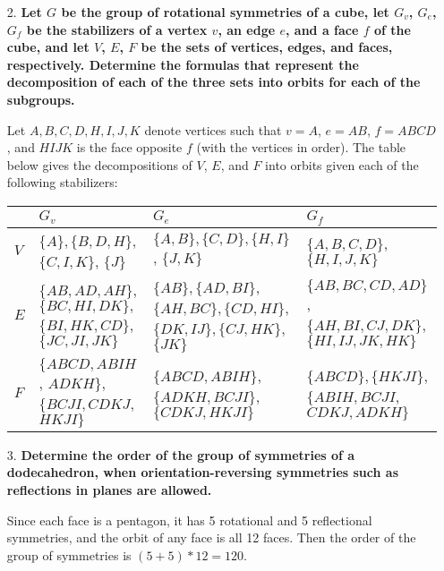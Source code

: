 \documentclass[a4paper,12pt]{article}
\begin{document}
\begin{enumerate}
    \item[2.]
        \boldmath
        \textbf{Let $G$ be the group of rotational symmetries of a cube, let $G_v$, $G_e$, $G_f$ be the stabilizers of a vertex $v$, an edge $e$, and a face $f$ of the cube, and let $V$, $E$, $F$ be the sets of vertices, edges, and faces, respectively. Determine the formulas that represent the decomposition of each of the three sets into orbits for each of the subgroups.} \par
        \unboldmath
        Let $A, B, C, D, H, I, J, K$ denote vertices such that $v = A$, $e = AB$, $f = ABCD$, and $HIJK$ is the face opposite $f$ (with the vertices in order). The table below gives the decompositions of $V$, $E$, and $F$ into orbits given each of the following stabilizers:
        \begin{table}[h]
            \begin{tabularx}{\textwidth}{|l|X|X|X|}
                \hline
                & $G_v$ & $G_e$ & $G_f$ \\ \hline
                $V$
                    & $\{ A \}, \{ B, D, H \}$, $\{ C, I, K \}$, $\{ J \}$
                    & $\{ A, B\}, \{ C, D \}, \{ H, I \}$, $\{ J, K \}$
                    & $\{ A, B, C, D \}$, $\{ H, I, J, K \}$
                \\ \hline
                $E$
                & $\{ AB, AD, AH \}$, $\{ BC, HI, DK \},$ $\{ BI, HK, CD \}$, $\{ JC, JI, JK \}$
                    & $\{ AB \}, \{ AD, BI \}$, $\{ AH, BC \}, \{ CD, HI \}$, $\{ DK, IJ \}, \{ CJ, HK \}$, $\{ JK \}$
                    & $\{ AB, BC, CD, AD \}$, $\{ AH, BI, CJ, DK \}$, $\{ HI, IJ, JK, HK \}$
                \\ \hline
                $F$
                    & $\{ ABCD, ABIH$, $ADKH \}$, $\{ BCJI, CDKJ$, $HKJI \}$
                    & $\{ ABCD, ABIH \}$, $\{ ADKH, BCJI \}$, $\{ CDKJ, HKJI \}$
                    & $\{ ABCD \}, \{ HKJI \}$, $\{ ABIH, BCJI$, $CDKJ, ADKH \}$
                \\ \hline
            \end{tabularx}
        \end{table}

    \item[3.]
        \boldmath
        \textbf{Determine the order of the group of symmetries of a dodecahedron, when orientation-reversing symmetries such as reflections in planes are allowed.} \par
        \unboldmath
        Since each face is a pentagon, it has 5 rotational and 5 reflectional symmetries, and the orbit of any face is all 12 faces. Then the order of the group of symmetries is $(5 + 5) * 12 = 120$.


\end{enumerate}
\end{document}
